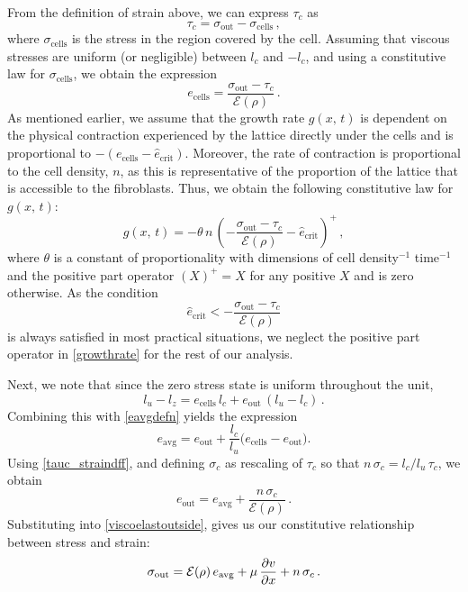 From the definition of strain above, we can express $\tau_c$ as
\begin{equation}
 \tau_c = \sigma_\text{out} - \sigma_\text{cells} \,, \label{tauc_straindff}
\end{equation}
where $\sigma_\text{cells}$ is the stress in the region covered by the cell. Assuming that viscous stresses are uniform (or negligible) between $l_c$ and $-l_c$, and using a constitutive law for $\sigma_\text{cells}$, we obtain the expression
\begin{equation*}
 e_\text{cells} = \frac{\sigma_\text{out} - \tau_c}{\mathcal{E}(\rho)}\,.  %
\end{equation*}
As mentioned earlier, we assume that the growth rate $g(x,\,t)$ is dependent on the physical contraction experienced by the lattice directly under the cells and is proportional to $- (e_\text{cells} - \hat{e}_\text{crit})$. Moreover, the rate of contraction is proportional to the cell density, $n$, as this is representative of the proportion of the lattice that is accessible to the fibroblasts. Thus, we obtain the following constitutive law for $g(x,\,t)$:
\begin{equation}
 g(x,\,t) = - \theta\, n\, \left(- \frac{\sigma_\text{out} - \tau_c}{\mathcal{E}(\rho)} - \hat{e}_\text{crit}\right)^{+}\,, \label{growthrate}
\end{equation}
where $\theta$ is a constant of proportionality with dimensions of cell density$^{-1}$ time$^{-1}$ and the positive part operator $(X)^{+}=X$ for any positive $X$ and is zero otherwise. As the condition
\[
\hat{e}_\text{crit} < - \frac{\sigma_\text{out} - \tau_c}{\mathcal{E}(\rho)} %
\]
is always satisfied in most practical situations, we neglect the positive part operator in \eqref{growthrate} for the rest of our analysis.

Next, we note that since the zero stress state is uniform throughout the unit,
\begin{equation}
 l_u - l_z = e_\text{cells} \, l_c + e_\text{out} \, (l_u - l_c)\,. \label{ecellsandout}
\end{equation}
Combining this with \eqref{eavgdefn} yields the expression
\[
 e_\text{avg} = e_\text{out} + \frac{l_c}{l_u} \big(e_\text{cells} - e_\text{out}\big).
\]
Using \eqref{tauc_straindff}, and defining $\sigma_c$ as rescaling of $\tau_c$ so that $n \, \sigma_c = l_c/l_u \, \tau_c$, we obtain
\[
 e_\text{out} = e_\text{avg} + \frac{n \, \sigma_c}{\mathcal{E}(\rho)}\,.
\]
Substituting into \eqref{viscoelastoutside}, gives us our constitutive relationship between stress and strain:
\begin{equation*}
 \sigma_\text{out} = \mathcal{E}(\rho) \, e_\text{avg} + \mu\,\frac{\partial v}{\partial x} + n \, \sigma_c\,. \label{cellelasticconst}
\end{equation*}

